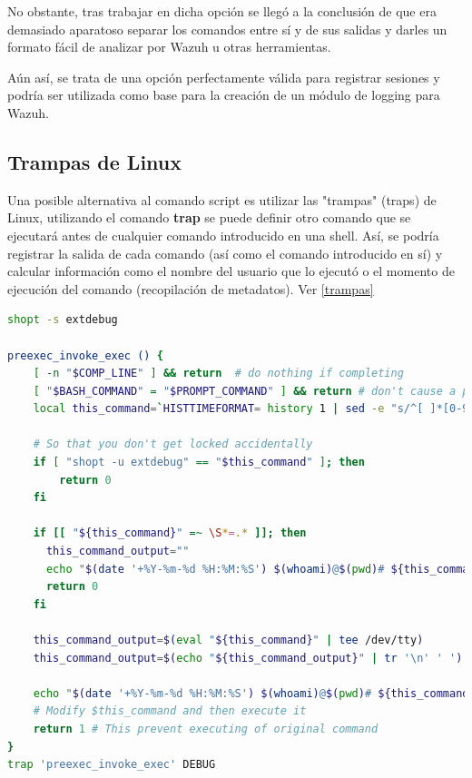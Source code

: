 No obstante, tras trabajar en dicha opción se llegó a la conclusión de que era demasiado aparatoso separar los comandos entre sí y de sus salidas y darles un formato fácil de analizar por Wazuh u otras herramientas.

Aún así, se trata de una opción perfectamente válida para registrar sesiones y podría ser utilizada como base para la creación de un módulo de logging para Wazuh.

\subsection{Trampas de Linux}

Una posible alternativa al comando script es utilizar las "trampas" (traps) de Linux, utilizando el comando \textbf{trap} se puede definir otro comando que se ejecutará antes de cualquier comando introducido en una shell. Así, se podría registrar la salida de cada comando (así como el comando introducido en sí) y calcular información como el nombre del usuario que lo ejecutó  o el momento de ejecución del comando (recopilación de metadatos). Ver \ref{trampas}

\begin{lstlisting}[language=bash,caption={Session recorder (on bashrc file) \newline Fuente: https://unix.stackexchange.com/questions/250713/modify-all-bash-commands-through-a-program-before-executing-them}, label=trampas]
shopt -s extdebug

preexec_invoke_exec () {
    [ -n "$COMP_LINE" ] && return  # do nothing if completing
    [ "$BASH_COMMAND" = "$PROMPT_COMMAND" ] && return # don't cause a preexec for $PROMPT_COMMAND
    local this_command=`HISTTIMEFORMAT= history 1 | sed -e "s/^[ ]*[0-9]*[ ]*//"`;

    # So that you don't get locked accidentally
    if [ "shopt -u extdebug" == "$this_command" ]; then
        return 0
    fi

    if [[ "${this_command}" =~ \S*=.* ]]; then
      this_command_output=""
      echo "$(date '+%Y-%m-%d %H:%M:%S') $(whoami)@$(pwd)# ${this_command}: $this_command_output"
      return 0
    fi

    this_command_output=$(eval "${this_command}" | tee /dev/tty)
    this_command_output=$(echo "${this_command_output}" | tr '\n' ' ')

    echo "$(date '+%Y-%m-%d %H:%M:%S') $(whoami)@$(pwd)# ${this_command}: $this_command_output"
    # Modify $this_command and then execute it
    return 1 # This prevent executing of original command
}
trap 'preexec_invoke_exec' DEBUG
\end{lstlisting}

